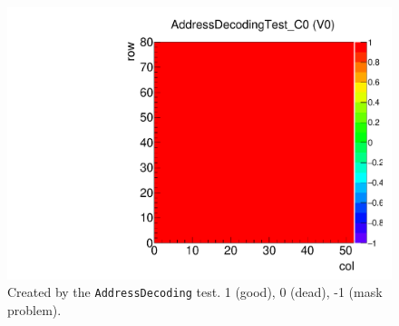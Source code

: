 \begin{figure}[!htp]
\centering
\begin{minipage}{0.45\textwidth}
  \includegraphics[width=1.0\textwidth]{figures/alive_AddressDecodingTest.pdf}
  \caption{Created by the {\tt AddressDecoding} test.
  1 (good), 0 (dead), -1 (mask problem).}
  \label{fig:alive_AddressDecodingTest}
\end{minipage}
\end{figure}
